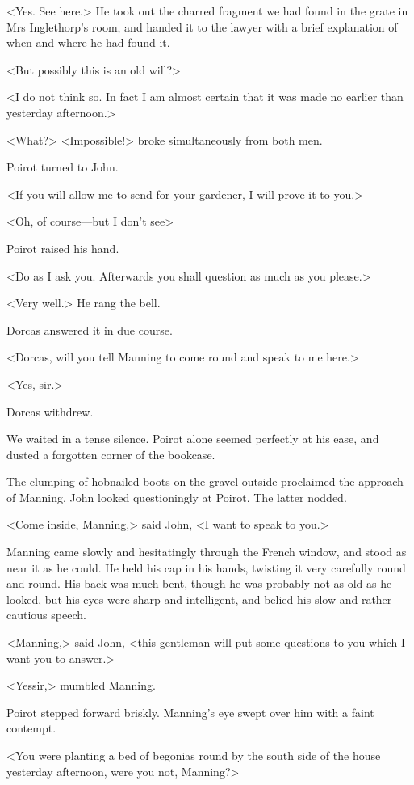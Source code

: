  <Yes. See here.> He took out the charred fragment we had found in the grate in Mrs Inglethorp's room, and handed it to the lawyer with a brief explanation of when and where he had found it. 

 <But possibly this is an old will?> 

 <I do not think so. In fact I am almost certain that it was made no earlier than yesterday afternoon.> 

 <What?> <Impossible!> broke simultaneously from both men. 

 Poirot turned to John. 

 <If you will allow me to send for your gardener, I will prove it to you.> 

 <Oh, of course—but I don't see\longdash> 

 Poirot raised his hand. 

 <Do as I ask you. Afterwards you shall question as much as you please.> 

 <Very well.> He rang the bell. 

 Dorcas answered it in due course. 

 <Dorcas, will you tell Manning to come round and speak to me here.> 

 <Yes, sir.> 

 Dorcas withdrew. 

 We waited in a tense silence. Poirot alone seemed perfectly at his ease, and dusted a forgotten corner of the bookcase. 

 The clumping of hobnailed boots on the gravel outside proclaimed the approach of Manning. John looked questioningly at Poirot. The latter nodded. 

 <Come inside, Manning,> said John, <I want to speak to you.> 

 Manning came slowly and hesitatingly through the French window, and stood as near it as he could. He held his cap in his hands, twisting it very carefully round and round. His back was much bent, though he was probably not as old as he looked, but his eyes were sharp and intelligent, and belied his slow and rather cautious speech. 

 <Manning,> said John, <this gentleman will put some questions to you which I want you to answer.> 

 <Yessir,> mumbled Manning. 

 Poirot stepped forward briskly. Manning's eye swept over him with a faint contempt. 

 <You were planting a bed of begonias round by the south side of the house yesterday afternoon, were you not, Manning?> 

